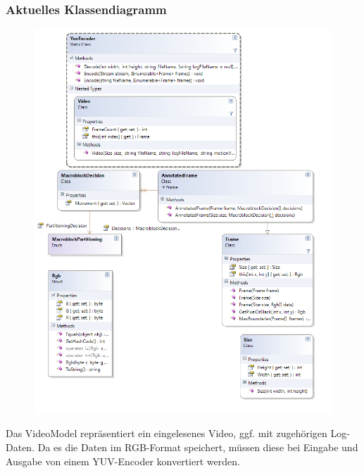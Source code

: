 \subsection{}

\subsubsection*{Aktuelles Klassendiagramm}
\begin{figure}[h!]
\begin{center}
\includegraphics[height=0.7\textheight]{classdiagram/videomodel.png}
\end{center}
\end{figure}
Das VideoModel repräsentiert ein eingelesenes Video, ggf. mit zugehörigen Log-Daten. Da es die Daten im RGB-Format speichert, müssen diese bei Eingabe und Ausgabe von einem YUV-Encoder konvertiert werden.
\newpage

